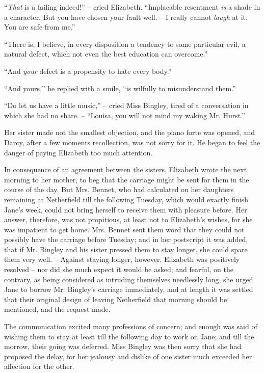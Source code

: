 “\textit{That} is a failing indeed!” -- cried Elizabeth. “Implacable
resentment \textit{is} a shade in a character. But you
have chosen your fault well. -- I really cannot \textit{laugh} at it.
You are safe from me.”

“There is, I believe, in every disposition a tendency
to some particular evil, a natural defect, which not even
the best education can overcome.”

“And \textit{your} defect is a propensity to hate every body.”

“And yours,” he replied with a smile, “is wilfully to
misunderstand them.”

“Do let us have a little music,” -- cried Miss Bingley,
tired of a conversation in which she had no share. --
“Louisa, you will not mind my waking Mr. Hurst.”

Her sister made not the smallest objection, and the
piano forte was opened, and Darcy, after a few moments
recollection, was not sorry for it. He began to feel the
danger of paying Elizabeth too much attention.


In consequence of an agreement between the sisters,
Elizabeth wrote the next morning to her mother, to beg
that the carriage might be sent for them in the course
of the day. But Mrs. Bennet, who had calculated on her
daughters remaining at Netherfield till the following
Tuesday, which would exactly finish Jane’s week, could
not bring herself to receive them with pleasure before.
Her answer, therefore, was not propitious, at least not to
Elizabeth’s wishes, for she was impatient to get home.
Mrs. Bennet sent them word that they could not possibly
have the carriage before Tuesday; and in her postscript
it was added, that if Mr. Bingley and his sister pressed them
to stay longer, she could spare them very well. -- Against
staying longer, however, Elizabeth was positively resolved -- nor
did she much expect it would be asked; and fearful,
on the contrary, as being considered as intruding themselves
needlessly long, she urged Jane to borrow Mr.
Bingley’s carriage immediately, and at length it was
settled that their original design of leaving Netherfield
that morning should be mentioned, and the request made.

The communication excited many professions of concern;
and enough was said of wishing them to stay at least till
the following day to work on Jane; and till the morrow,
their going was deferred. Miss Bingley was then sorry that
she had proposed the delay, for her jealousy and dislike
of one sister much exceeded her affection for the other.

